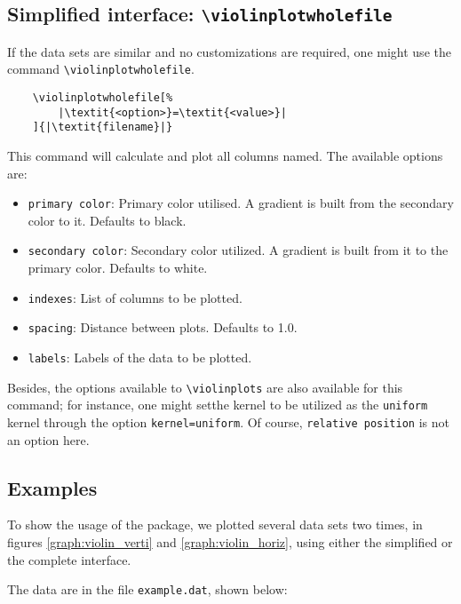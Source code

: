 \documentclass{article}
\begin{document}
\subsection{Simplified interface: \texttt{{\textbackslash}violinplotwholefile}}

If the data sets are similar and no customizations are required, one might
use the command \texttt{{\textbackslash}violinplotwholefile}.

\begin{verbatim}
	\violinplotwholefile[%
		|\textit{<option>}=\textit{<value>}|
	]{|\textit{filename}|}
\end{verbatim}

This command will calculate and plot all columns named. The available options
are:

\begin{itemize}
	\item \texttt{primary color}: Primary color utilised. A gradient is built from
		the secondary color to it. Defaults to black.
	\item \texttt{secondary color}: Secondary color utilized. A
		gradient is built from it to the primary color. Defaults
		to white.
	\item \texttt{indexes}: List of columns to be plotted.
	\item \texttt{spacing}: Distance between plots. Defaults to 1.0.
	\item \texttt{labels}: Labels of the data to be plotted.
\end{itemize}

Besides, the options available to \texttt{{\textbackslash}violinplots} are also
available for this command; for instance, one might setthe kernel to
be utilized as the \texttt{uniform} kernel through the option
\texttt{kernel=uniform}. Of course, \texttt{relative position} is not an option
here.

\subsection{Examples}

To show the usage of the package, we plotted several data sets two times, in
figures \ref{graph:violin_verti} and \ref{graph:violin_horiz}, using either the
simplified or the complete interface.

The data are in the file \texttt{example.dat}, shown below:

\end{document}
